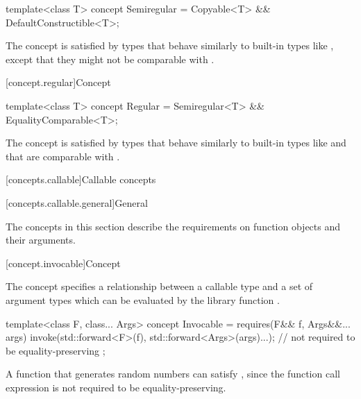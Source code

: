 %
\begin{itemdecl}
template<class T>
  concept Semiregular = Copyable<T> && DefaultConstructible<T>;
\end{itemdecl}

\begin{itemdescr}
\pnum
\begin{note}
The  concept is satisfied by types that behave similarly
to built-in types like , except that they might not
be comparable with \tcode{==}.
\end{note}
\end{itemdescr}

[concept.regular]{Concept }

%
\begin{itemdecl}
template<class T>
  concept Regular = Semiregular<T> && EqualityComparable<T>;
\end{itemdecl}

\begin{itemdescr}
\pnum
\begin{note}
The  concept is satisfied by types that behave similarly to
built-in types like  and that are comparable with
\tcode{==}.
\end{note}
\end{itemdescr}

[concepts.callable]{Callable concepts}

[concepts.callable.general]{General}

\pnum
The concepts in this section describe the requirements on function
objects and their arguments.

[concept.invocable]{Concept }

\pnum
The  concept specifies a relationship between a callable
type  and a set of argument types  which
can be evaluated by the library function .

%
\begin{itemdecl}
template<class F, class... Args>
  concept Invocable = requires(F&& f, Args&&... args) {
    invoke(std::forward<F>(f), std::forward<Args>(args)...); // not required to be equality-preserving
  };
\end{itemdecl}

\begin{itemdescr}
\pnum
\begin{example}
A function that generates random numbers can satisfy ,
since the  function call expression is not required to be
equality-preserving.
\end{example}
\end{itemdescr}

